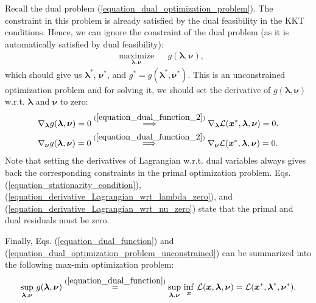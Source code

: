 \documentclass[lang=cn,10pt]{gorgeousnbook}
\numberwithin{equation}{section}%
\numberwithin{figure}{section}%
\begin{document}
Recall the dual problem (\ref{equation_dual_optimization_problem}). The constraint in this problem is already satisfied by the dual feasibility in the KKT conditions. Hence, we can ignore the constraint of the dual problem (as it is automatically satisfied by dual feasibility):
\begin{equation}\label{equation_dual_optimization_problem_unconstrained}
\begin{aligned}
& \underset{\boldsymbol{\lambda}, \boldsymbol{\nu}}{\text{maximize}}
& & g(\boldsymbol{\lambda}, \boldsymbol{\nu}), 
\end{aligned}
\end{equation}
which should give us $\boldsymbol{\lambda}^*$, $\boldsymbol{\nu}^*$, and $g^* = g(\boldsymbol{\lambda}^*, \boldsymbol{\nu}^*)$.
This is an unconstrained optimization problem and for solving it, we should set the derivative of $g(\boldsymbol{\lambda}, \boldsymbol{\nu})$ w.r.t. $\boldsymbol{\lambda}$ and $\boldsymbol{\nu}$ to zero:
\begin{align}
& \nabla_{\boldsymbol{\lambda}} g(\boldsymbol{\lambda}, \boldsymbol{\nu}) = 0 \overset{(\ref{equation_dual_function_2})}{\implies} \nabla_{\boldsymbol{\lambda}} \mathcal{L}(\boldsymbol{x}^*,\boldsymbol{\lambda},\boldsymbol{\nu}) = 0. \label{equation_derivative_Lagrangian_wrt_lambda_zero} \\
& \nabla_{\boldsymbol{\nu}} g(\boldsymbol{\lambda}, \boldsymbol{\nu}) = 0 \overset{(\ref{equation_dual_function_2})}{\implies} \nabla_{\boldsymbol{\nu}} \mathcal{L}(\boldsymbol{x}^*,\boldsymbol{\lambda},\boldsymbol{\nu}) = 0. \label{equation_derivative_Lagrangian_wrt_nu_zero}
\end{align}
Note that setting the derivatives of Lagrangian w.r.t. dual variables always gives back the corresponding constraints in the primal optimization problem. 
Eqs. (\ref{equation_stationarity_condition}), (\ref{equation_derivative_Lagrangian_wrt_lambda_zero}), and (\ref{equation_derivative_Lagrangian_wrt_nu_zero}) state that the primal and dual residuals must be zero. 

Finally, Eqs. (\ref{equation_dual_function}) and (\ref{equation_dual_optimization_problem_unconstrained}) can be summarized into the following max-min optimization problem:
\begin{align}
\sup_{\boldsymbol{\lambda}, \boldsymbol{\nu}}\, g(\boldsymbol{\lambda}, \boldsymbol{\nu}) \overset{(\ref{equation_dual_function})}{=} \sup_{\boldsymbol{\lambda}, \boldsymbol{\nu}}\, \inf_{\boldsymbol{x}}\, \mathcal{L}(\boldsymbol{x},\boldsymbol{\lambda}, \boldsymbol{\nu}) = \mathcal{L}(\boldsymbol{x}^*,\boldsymbol{\lambda}^*, \boldsymbol{\nu}^*).
\end{align}
\end{document}
